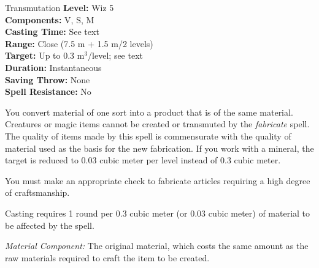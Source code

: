 {Transmutation}
{
	\textbf{Level:}
	Wiz 5\\
	\textbf{Components:}
	V, S, M\\
	\textbf{Casting Time:}
	See text\\
	\textbf{Range:}
	Close (7.5 m + 1.5 m/2 levels)\\
	\textbf{Target:}
	Up to 0.3 m$^3$/level; see text\\
	\textbf{Duration:}
	Instantaneous\\
	\textbf{Saving Throw:}
	None\\
	\textbf{Spell Resistance:}
	No\\
}
{
	You convert material of one sort into a product that is of the same material. Creatures or magic items cannot be created or transmuted by the \emph{fabricate} spell. The quality of items made by this spell is commensurate with the quality of material used as the basis for the new fabrication. If you work with a mineral, the target is reduced to 0.03 cubic meter per level instead of 0.3 cubic meter.

	You must make an appropriate  check to fabricate articles requiring a high degree of craftsmanship.

	Casting requires 1 round per 0.3 cubic meter (or 0.03 cubic meter) of material to be affected by the spell.

	\textit{Material Component:}
	The original material, which costs the same amount as the raw materials required to craft the item to be created.

}
